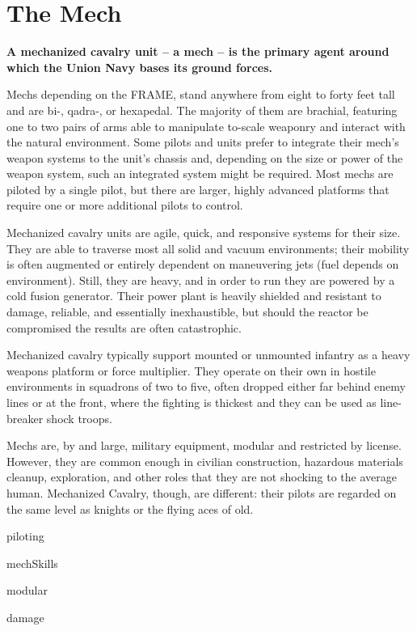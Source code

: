\chapter{The Mech}

\textbf{A mechanized cavalry unit -- a mech -- is the primary agent around which the Union Navy bases its ground forces.}

Mechs depending on the FRAME, stand anywhere from eight to forty feet tall and are bi-, qadra-, or hexapedal. The majority of them are brachial, featuring one to two pairs of arms able to manipulate to-scale weaponry and interact with the natural environment. Some pilots and units prefer to integrate their mech's weapon systems to the unit's chassis and, depending on the size or power of the weapon system, such an integrated system might be required. Most mechs are piloted by a single pilot, but there are larger, highly advanced platforms that require one or more additional pilots to control. 

Mechanized cavalry units are agile, quick, and responsive systems for their size. They are able to traverse most all solid and vacuum environments; their mobility is often augmented or entirely dependent on maneuvering jets (fuel depends on environment). Still, they are heavy, and in order to run they are powered by a cold fusion generator. Their power plant is heavily shielded and resistant to damage, reliable, and essentially inexhaustible, but should the reactor be compromised the results are often catastrophic. 

Mechanized cavalry typically support mounted or unmounted infantry as a heavy weapons platform or force multiplier. They operate on their own in hostile environments in squadrons of two to five, often dropped either far behind enemy lines or at the front, where the fighting is thickest and they can be used as line-breaker shock troops. 

Mechs are, by and large, military equipment, modular and restricted by license. However, they are common enough in civilian construction, hazardous materials cleanup, exploration, and other roles that they are not shocking to the average human. Mechanized Cavalry, though, are different: their pilots are regarded on the same level as knights or the flying aces of old.

{piloting}

{mechSkills}

{modular}

{damage}
